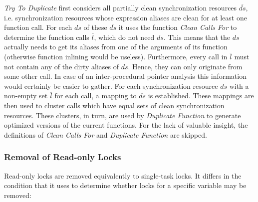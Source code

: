 \textit{Try To Duplicate} first considers all partially clean synchronization resources $\overline{ds}$, i.e. synchronization resources whose expression aliases are clean for at least one function call. For each $ds$ of these $\overline{ds}$ it uses the function \textit{Clean Calls For} to determine the function calls $\overline{l}$, which do not need $ds$. This means that the $ds$ actually needs to get its aliases from one of the arguments of its function (otherwise function inlining would be useless). Furthermore, every call in $\overline{l}$ must not contain any of the dirty aliases of $ds$. Hence, they can only originate from some other call. In case of an inter-procedural pointer analysis this information would certainly be easier to gather. For each synchronization resource $ds$ with a non-empty set $\overline{l}$ for each call, a mapping to $ds$ is established. These mappings are then used to cluster calls which have equal sets of clean synchronization resources. These clusters, in turn, are used by \textit{Duplicate Function} to generate optimized versions of the current functions. For the lack of valuable insight, the definitions of \textit{Clean Calls For} and \textit{Duplicate Function} are skipped.

\subsubsection{Removal of Read-only Locks}
Read-only locks are removed equivalently to single-task locks. It differs in the condition that it uses to determine whether locks for a specific variable may be removed: 

\vspace{4mm}


